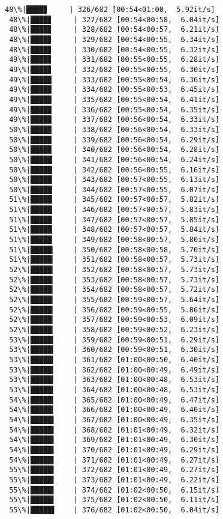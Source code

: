\documentclass[11pt]{article}
\begin{document}
\begin{Verbatim}[commandchars=\\\{\}]
 48\%|████▊     | 326/682 [00:54<01:00,  5.92it/s]
 48\%|████▊     | 327/682 [00:54<00:58,  6.04it/s]
 48\%|████▊     | 328/682 [00:54<00:57,  6.21it/s]
 48\%|████▊     | 329/682 [00:54<00:55,  6.34it/s]
 48\%|████▊     | 330/682 [00:54<00:55,  6.32it/s]
 49\%|████▊     | 331/682 [00:55<00:55,  6.28it/s]
 49\%|████▊     | 332/682 [00:55<00:55,  6.30it/s]
 49\%|████▉     | 333/682 [00:55<00:54,  6.36it/s]
 49\%|████▉     | 334/682 [00:55<00:53,  6.45it/s]
 49\%|████▉     | 335/682 [00:55<00:54,  6.41it/s]
 49\%|████▉     | 336/682 [00:55<00:54,  6.35it/s]
 49\%|████▉     | 337/682 [00:56<00:54,  6.33it/s]
 50\%|████▉     | 338/682 [00:56<00:54,  6.33it/s]
 50\%|████▉     | 339/682 [00:56<00:54,  6.29it/s]
 50\%|████▉     | 340/682 [00:56<00:54,  6.28it/s]
 50\%|█████     | 341/682 [00:56<00:54,  6.24it/s]
 50\%|█████     | 342/682 [00:56<00:55,  6.16it/s]
 50\%|█████     | 343/682 [00:57<00:55,  6.13it/s]
 50\%|█████     | 344/682 [00:57<00:55,  6.07it/s]
 51\%|█████     | 345/682 [00:57<00:57,  5.82it/s]
 51\%|█████     | 346/682 [00:57<00:57,  5.83it/s]
 51\%|█████     | 347/682 [00:57<00:57,  5.85it/s]
 51\%|█████     | 348/682 [00:57<00:57,  5.84it/s]
 51\%|█████     | 349/682 [00:58<00:57,  5.80it/s]
 51\%|█████▏    | 350/682 [00:58<00:58,  5.70it/s]
 51\%|█████▏    | 351/682 [00:58<00:57,  5.73it/s]
 52\%|█████▏    | 352/682 [00:58<00:57,  5.73it/s]
 52\%|█████▏    | 353/682 [00:58<00:57,  5.73it/s]
 52\%|█████▏    | 354/682 [00:58<00:57,  5.72it/s]
 52\%|█████▏    | 355/682 [00:59<00:57,  5.64it/s]
 52\%|█████▏    | 356/682 [00:59<00:55,  5.86it/s]
 52\%|█████▏    | 357/682 [00:59<00:53,  6.09it/s]
 52\%|█████▏    | 358/682 [00:59<00:52,  6.23it/s]
 53\%|█████▎    | 359/682 [00:59<00:51,  6.29it/s]
 53\%|█████▎    | 360/682 [00:59<00:51,  6.30it/s]
 53\%|█████▎    | 361/682 [01:00<00:50,  6.40it/s]
 53\%|█████▎    | 362/682 [01:00<00:49,  6.49it/s]
 53\%|█████▎    | 363/682 [01:00<00:48,  6.53it/s]
 53\%|█████▎    | 364/682 [01:00<00:48,  6.53it/s]
 54\%|█████▎    | 365/682 [01:00<00:49,  6.47it/s]
 54\%|█████▎    | 366/682 [01:00<00:49,  6.40it/s]
 54\%|█████▍    | 367/682 [01:00<00:49,  6.35it/s]
 54\%|█████▍    | 368/682 [01:01<00:49,  6.32it/s]
 54\%|█████▍    | 369/682 [01:01<00:49,  6.30it/s]
 54\%|█████▍    | 370/682 [01:01<00:49,  6.29it/s]
 54\%|█████▍    | 371/682 [01:01<00:49,  6.27it/s]
 55\%|█████▍    | 372/682 [01:01<00:49,  6.27it/s]
 55\%|█████▍    | 373/682 [01:01<00:49,  6.22it/s]
 55\%|█████▍    | 374/682 [01:02<00:50,  6.15it/s]
 55\%|█████▍    | 375/682 [01:02<00:50,  6.11it/s]
 55\%|█████▌    | 376/682 [01:02<00:50,  6.04it/s]

\end{Verbatim}
\end{document}
